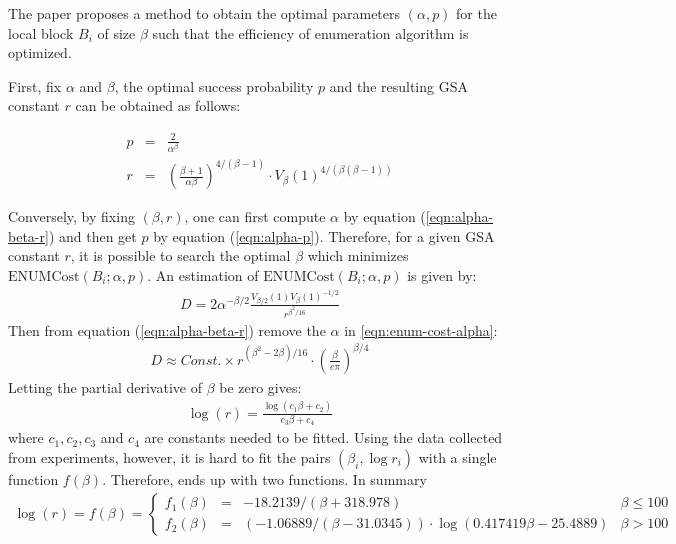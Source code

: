\documentclass[11pt]{article}
\newcommand{\ENUMCost}{\mathrm{ENUMCost}}
\begin{document}
The paper \cite{awht2016improved} proposes a method to obtain the optimal parameters $(\alpha,p)$ for the local block $B_i$ of size $\beta$ such that the efficiency of enumeration algorithm is optimized.

First, fix $\alpha$ and $\beta$, the optimal success probability $p$ and the resulting GSA constant $r$ can be obtained as follows:

\begin{eqnarray}
p &=& \frac{2}{\alpha^{\beta}} \label{eqn:alpha-p} \\
r &=& \left(\frac{\beta+1}{\alpha\beta}\right)^{4/(\beta-1)}\cdot V_{\beta}(1)^{4/(\beta(\beta-1))} \label{eqn:alpha-beta-r}
\end{eqnarray}

Conversely, by fixing $(\beta,r)$, one can first compute $\alpha$ by equation (\ref{eqn:alpha-beta-r}) and then get $p$ by equation (\ref{eqn:alpha-p}).
Therefore, for a given GSA constant $r$, it is possible to search the optimal $\beta$ which minimizes $\ENUMCost(B_i;\alpha,p)$.
An estimation of $\ENUMCost(B_i;\alpha,p)$ is given by:
\begin{eqnarray}
D = 2\alpha^{-\beta/2}\frac{V_{\beta/2}(1)V_{\beta}(1)^{-1/2}}{r^{\beta^2/16}} \label{eqn:enum-cost-alpha}
\end{eqnarray}
Then from equation (\ref{eqn:alpha-beta-r}) remove the $\alpha$ in \ref{eqn:enum-cost-alpha}:
\begin{eqnarray}
D\approx Const.\times r^{(\beta^2-2\beta)/16}\cdot\left(\frac{\beta}{e\pi}\right)^{\beta/4} \label{eqn:enum-cost}
\end{eqnarray}
Letting the partial derivative of $\beta$ be zero gives:
\begin{eqnarray}
\log(r)=\frac{\log (c_1\beta+c_2)}{c_3\beta+c_4}
\end{eqnarray}
where $c_1,c_2,c_3$ and $c_4$ are constants needed to be fitted.
Using the data collected from experiments, however, it is hard to fit the pairs $(\beta_i,\log r_i)$ with a single function $f(\beta)$.
Therefore, \cite{awht2016improved} ends up with two functions. In summary
\begin{eqnarray}
\log(r) = f(\beta)=\left\{\begin{matrix}f_1(\beta)&=&-18.2139/(\beta + 318.978) & \beta\leq 100 \\f_2(\beta)&=&(−1.06889/(\beta - 31.0345)) \cdot \log(0.417419\beta - 25.4889) & \beta > 100\end{matrix}\right. \label{eqn:f-beta}
\end{eqnarray}
\end{document}
